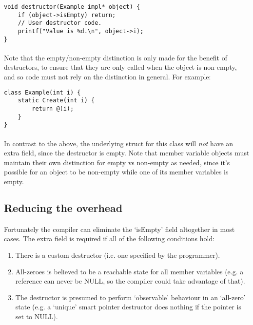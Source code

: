 \documentclass[12pt,twoside,notitlepage]{report}
\begin{document}
\begin{lstlisting}
void destructor(Example_impl* object) {
	if (object->isEmpty) return;
	// User destructor code.
	printf("Value is %d.\n", object->i);
}
\end{lstlisting}

\paragraph{}
Note that the empty/non-empty distinction is only made for the benefit of destructors, to ensure that they are only called when the object is non-empty, and so code must not rely on the distinction in general. For example:

\begin{lstlisting}
class Example(int i) {
	static Create(int i) {
		return @(i);
	}
}
\end{lstlisting}

\paragraph{}
In contrast to the above, the underlying struct for this class will \emph{not} have an extra field, since the destructor is empty. Note that member variable objects must maintain their own distinction for empty vs non-empty as needed, since it's possible for an object to be non-empty while one of its member variables is empty.

\subsection{Reducing the overhead}

\paragraph{}
Fortunately the compiler can eliminate the `isEmpty' field altogether in most cases. The extra field is required if all of the following conditions hold:

\begin{enumerate}
\item There is a custom destructor (i.e. one specified by the programmer).
\item All-zeroes is believed to be a reachable state for all member variables (e.g. a reference can never be NULL, so the compiler could take advantage of that).
\item The destructor is presumed to perform `observable' behaviour in an `all-zero' state (e.g. a `unique' smart pointer destructor does nothing if the pointer is set to NULL).
\end{enumerate}
\end{document}
